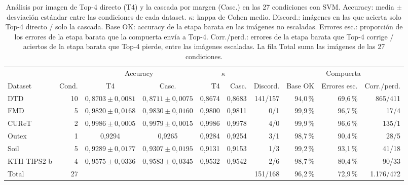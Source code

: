 \documentclass[a4paper,fleqn]{cas-sc}
\begin{document}
\begin{table}[pos=htbp]
\centering
\caption{Análisis por imagen de Top-4 directo (T4) y la cascada por margen (Casc.) en las 27 condiciones con SVM. Accuracy: media $\pm$ desviación estándar entre las condiciones de cada dataset. $\kappa$: kappa de Cohen medio. Discord.: imágenes en las que acierta solo Top-4 directo / solo la cascada. Base OK: accuracy de la etapa barata en las imágenes no escaladas. Errores esc.: proporción de los errores de la etapa barata que la compuerta envía a Top-4. Corr./perd.: errores de la etapa barata que Top-4 corrige / aciertos de la etapa barata que Top-4 pierde, entre las imágenes escaladas. La fila Total suma las imágenes de las 27 condiciones.}
\label{tab:por-imagen}
\footnotesize
\setlength{\tabcolsep}{3pt}
\begin{tabular}{@{}lrccrrrrrr@{}}
\toprule
 & & \multicolumn{2}{c}{Accuracy} & \multicolumn{2}{c}{$\kappa$} & & \multicolumn{3}{c}{Compuerta} \\
\cmidrule(lr){3-4}\cmidrule(lr){5-6}\cmidrule(l){8-10}
Dataset & Cond. & T4 & Casc. & T4 & Casc. & Discord. & Base OK & Errores esc. & Corr./perd. \\
\midrule
DTD & 10 & $0{,}8703\pm0{,}0081$ & $0{,}8711\pm0{,}0075$ & 0,8674 & 0,8683 & 141/157 & 94,0\,\% & 69,6\,\% & 865/411 \\
FMD & 5 & $0{,}9820\pm0{,}0168$ & $0{,}9830\pm0{,}0160$ & 0,9800 & 0,9811 & 0/1 & 99,9\,\% & 96,7\,\% & 17/4 \\
CUReT & 2 & $0{,}9986\pm0{,}0005$ & $0{,}9979\pm0{,}0015$ & 0,9986 & 0,9978 & 4/0 & 99,9\,\% & 96,6\,\% & 135/1 \\
Outex & 1 & 0,9294 & 0,9265 & 0,9284 & 0,9254 & 3/1 & 98,7\,\% & 90,4\,\% & 28/5 \\
Soil & 5 & $0{,}9289\pm0{,}0177$ & $0{,}9307\pm0{,}0195$ & 0,9131 & 0,9153 & 1/3 & 99,2\,\% & 93,1\,\% & 41/18 \\
KTH-TIPS2-b & 4 & $0{,}9575\pm0{,}0336$ & $0{,}9583\pm0{,}0345$ & 0,9532 & 0,9542 & 2/6 & 98,7\,\% & 80,4\,\% & 90/33 \\
\midrule
Total & 27 & & & & & 151/168 & 96,2\,\% & 72,9\,\% & 1.176/472 \\
\bottomrule
\end{tabular}
\end{table}
\end{document}
